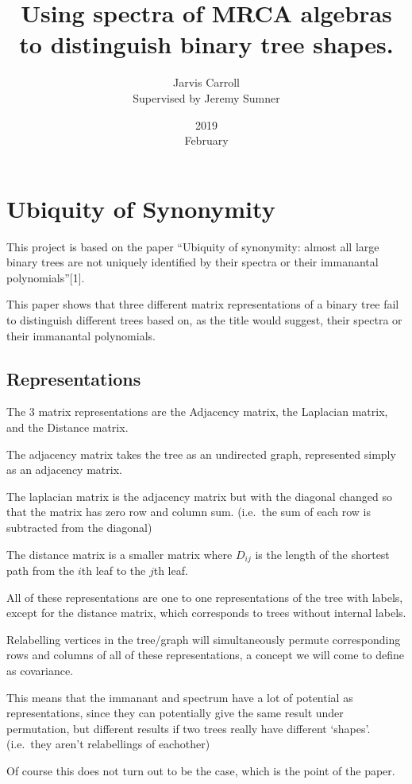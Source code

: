\documentclass[10pt,a4paper]{report}
\title{Using spectra of MRCA algebras to distinguish binary tree shapes.}
\date{2019\\ February}
\author{Jarvis Carroll
\\ Supervised by Jeremy Sumner}
\begin{document}
\maketitle

\chapter{Ubiquity of Synonymity}

This project is based on the paper ``Ubiquity of synonymity: almost all large
binary trees are not uniquely identified by their spectra or their immanantal
polynomials''[1].

This paper shows that three different matrix representations of a binary tree
fail to distinguish different trees based on, as the title would suggest, their
spectra or their immanantal polynomials.

\section{Representations}

The 3 matrix representations are the Adjacency matrix, the Laplacian matrix,
and the Distance matrix.

The adjacency matrix takes the tree as an undirected graph, represented simply
as an adjacency matrix.

The laplacian matrix is the adjacency matrix but with the diagonal changed so
that the matrix has zero row and column sum. (i.e.\ the sum of each row is
subtracted from the diagonal)

The distance matrix is a smaller matrix where $D_{ij}$ is the length of the
shortest path from the $i$th leaf to the $j$th leaf.

All of these representations are one to one representations of the tree with
labels, except for the distance matrix, which corresponds to trees without
internal labels.

Relabelling vertices in the tree/graph will simultaneously permute
corresponding rows and columns of all of these representations, a concept we
will come to define as covariance.

This means that the immanant and spectrum have a lot of potential as
representations, since they can potentially give the same result under
permutation, but different results if two trees really have different `shapes'.
(i.e.\ they aren't relabellings of eachother)

Of course this does not turn out to be the case, which is the point of the
paper.
\end{document}
